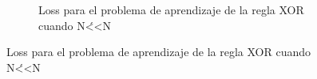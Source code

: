 \begin{figure}[H]
\begin{subfigure}[b]{0.45\textwidth}
         \caption{Loss para el problema de aprendizaje de la regla XOR cuando N\'<<N}
         \label{fig:loss6a}
     \end{subfigure}
\end{figure}
